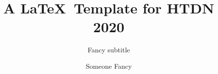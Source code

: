 \documentclass[10pt,sigconf]{acmart}
\begin{document}
\title{A \LaTeX\ Template for HTDN 2020}

\subtitle{Fancy subtitle}
 \author{Someone Fancy}

 

\maketitle








\end{document}
